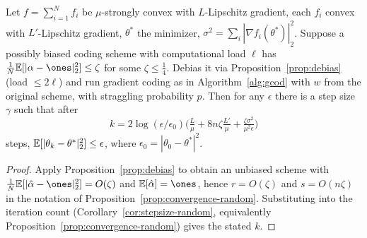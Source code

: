 \begin{proposition}
  \label{prop:convergence-biased}
  Let $f = \sum_{i=1}^N f_i$ be $\mu$-strongly convex with $L$-Lipschitz
  gradient, each $f_i$ convex with $L'$-Lipschitz gradient, $\theta^*$ the
  minimizer, $\sigma^2 = \sum_i|\nabla f_i(\theta^*)|_2^2$. Suppose a possibly
  biased coding scheme with computational load $\ell$ has
  $\tfrac1N\E[|\alpha - \ones|_2^2] \le \zeta$ for some $\zeta \le \tfrac14$.
  Debias it via Proposition~\ref{prop:debias} (load $\le 2\ell$) and run gradient
  coding as in Algorithm~\ref{alg:gcod} with $w$ from the original scheme, with
  straggling probability $p$. Then for any $\epsilon$ there is a step size
  $\gamma$ such that after
  \[
    k = 2\log(\epsilon/\epsilon_0)\Big(\tfrac{L}{\mu} + 8n\zeta\tfrac{L'}{\mu}
      + \tfrac{\zeta\sigma^2}{\mu^2\epsilon}\Big)
  \]
  steps, $\mathbb{E}[|\theta_k - \theta^*|_2^2] \le \epsilon$, where
  $\epsilon_0 = |\theta_0 - \theta^*|^2$.
\end{proposition}
\begin{proof}
  Apply Proposition~\ref{prop:debias} to obtain an unbiased scheme with
  $\tfrac1N\E[|\hat\alpha - \ones|_2^2] = O(\zeta)$ and $\E[\hat\alpha] = \ones$,
  hence $r = O(\zeta)$ and $s = O(n\zeta)$ in the notation of
  Proposition~\ref{prop:convergence-random}. Substituting into the iteration
  count (Corollary~\ref{cor:stepsize-random}, equivalently
  Proposition~\ref{prop:convergence-random}) gives the stated $k$.
\end{proof}
